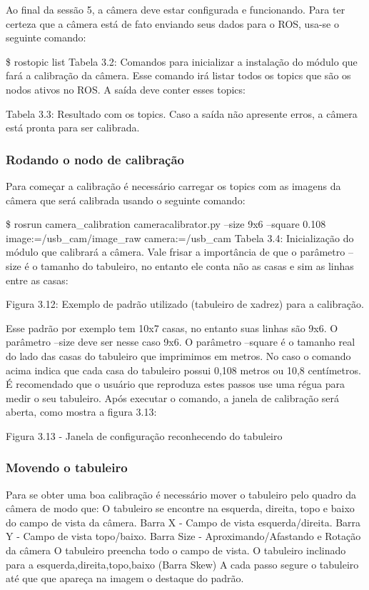Ao final da sessão 5, a câmera deve estar configurada e funcionando. Para ter certeza que a câmera está de fato enviando seus dados para o ROS, usa-se o seguinte comando:

\$ rostopic list
Tabela 3.2: Comandos para inicializar a instalação do módulo que fará a calibração da câmera.
Esse comando irá listar todos os topics que são os nodos ativos no ROS. A saída deve conter esses topics:

Tabela 3.3: Resultado com os topics.
Caso a saída não apresente erros, a câmera está pronta para ser calibrada.

\subsubsection{Rodando o nodo de calibração}

Para começar a calibração é necessário carregar os topics com as imagens da câmera que será calibrada usando o seguinte comando:

\$ rosrun camera\_calibration cameracalibrator.py --size 9x6 --square 0.108 image:=/usb\_cam/image\_raw camera:=/usb\_cam
Tabela 3.4: Inicialização do módulo que calibrará a câmera.
Vale frisar a importância de que o parâmetro --size é o tamanho do tabuleiro, no entanto ele conta não as casas e sim as linhas entre as casas:

Figura 3.12: Exemplo de padrão utilizado (tabuleiro de xadrez) para a calibração.

Esse padrão por exemplo tem 10x7 casas, no entanto suas linhas são 9x6. O parâmetro --size deve ser nesse caso 9x6.
O parâmetro --square é o tamanho real do lado das casas do tabuleiro que imprimimos em metros. No caso o comando acima indica que cada casa do tabuleiro possui 0,108 metros ou 10,8 centímetros. É recomendado que o usuário que reproduza estes passos use uma régua para medir o seu tabuleiro.
Após executar o comando, a janela de calibração será aberta, como mostra a figura 3.13:

Figura 3.13 - Janela de configuração reconhecendo do tabuleiro

\subsubsection{Movendo o tabuleiro}

Para se obter uma boa calibração é necessário mover o tabuleiro pelo quadro da câmera de modo que:
O tabuleiro se encontre na esquerda, direita, topo e baixo do campo de vista da câmera.
Barra X - Campo de vista esquerda/direita.
Barra Y - Campo de vista topo/baixo.
Barra Size - Aproximando/Afastando e Rotação da câmera
O tabuleiro preencha todo o campo de vista.
O tabuleiro inclinado para a esquerda,direita,topo,baixo (Barra Skew)
A cada passo segure o tabuleiro até que que apareça na imagem o destaque do padrão.





